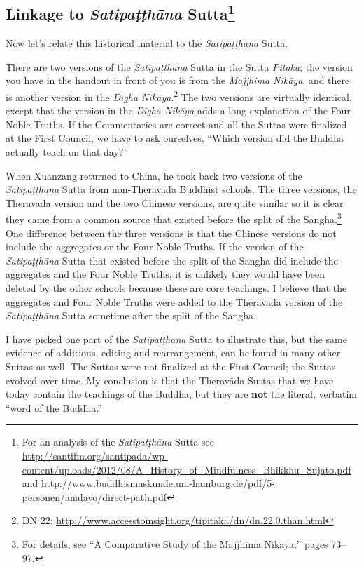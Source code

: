 \subsection*{Linkage to \textit{Satipaṭṭhāna} Sutta\footnote{For an analysis of the \textit{Satipaṭṭhāna} Sutta see \url{http://santifm.org/santipada/wp-content/uploads/2012/08/A_History_of_Mindfulness_Bhikkhu_Sujato.pdf} and \url{http://www.buddhismuskunde.uni-hamburg.de/pdf/5-personen/analayo/direct-path.pdf} }}
Now let’s relate this historical material to the \textit{Satipaṭṭhāna} Sutta.

There are two versions of the \textit{Satipaṭṭhāna} Sutta in the Sutta \textit{Piṭaka}; the version you have in the handout in front of you is from the \textit{Majjhima Nikāya}, and there is another version in the \textit{Dīgha Nikāya}.\footnote{DN 22: \url{http://www.accesstoinsight.org/tipitaka/dn/dn.22.0.than.html}} The two versions are virtually identical, except that the version in the \textit{Dīgha Nikāya} adds a long explanation of the Four Noble Truths. If the Commentaries are correct and all the Suttas were finalized at the First Council, we have to ask ourselves, “Which version did the Buddha actually teach on that day?”

When Xuanzang returned to China, he took back two versions of the \textit{Satipaṭṭhāna} Sutta from non-Theravāda Buddhist schools. The three versions, the Theravāda version and the two Chinese versions, are quite similar so it is clear they came from a common source that existed before the split of the Sangha.\footnote{For details, see “A Comparative Study of the Majjhima Nikāya,” pages 73--97.} One difference between the three versions is that the Chinese versions do not include the aggregates or the Four Noble Truths. If the version of the \textit{Satipaṭṭhāna} Sutta that existed before the split of the Sangha did include the aggregates and the Four Noble Truths, it is unlikely they would have been deleted by the other schools because these are core teachings. I believe that the aggregates and Four Noble Truths were added to the Theravāda version of the \textit{Satipaṭṭhāna} Sutta sometime after the split of the Sangha.

I have picked one part of the \textit{Satipaṭṭhāna} Sutta to illustrate this, but the same evidence of additions, editing and rearrangement, can be found in many other Suttas as well. The Suttas were not finalized at the First Council; the Suttas evolved over time. My conclusion is that the Theravāda Suttas that we have today contain the teachings of the Buddha, but they are \textbf{not} the literal, verbatim “word of the Buddha.”

